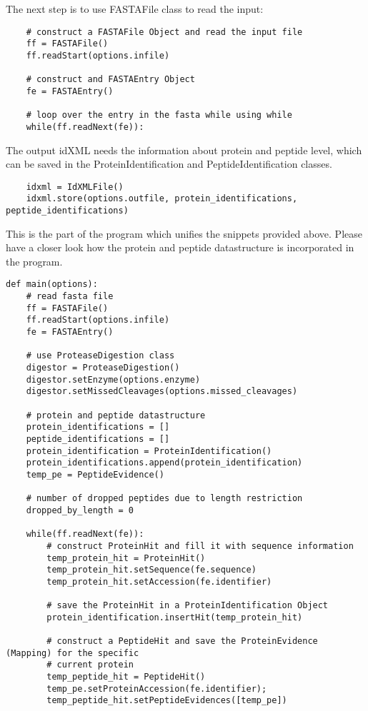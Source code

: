 {\noindent The next step is to use FASTAFile class to read the input:
\begin{lstlisting}
    # construct a FASTAFile Object and read the input file
    ff = FASTAFile()
    ff.readStart(options.infile)
    
    # construct and FASTAEntry Object 
    fe = FASTAEntry()
    
    # loop over the entry in the fasta while using while
    while(ff.readNext(fe)): 
\end{lstlisting}


\noindent The output idXML needs the information about protein and peptide level, which can be saved in the ProteinIdentification and PeptideIdentification classes. 
\begin{lstlisting}
    idxml = IdXMLFile()
    idxml.store(options.outfile, protein_identifications, peptide_identifications)
\end{lstlisting}

\noindent This is the part of the program which unifies the snippets provided above. Please have a closer look how the protein and peptide datastructure is incorporated in the program. 

\begin{lstlisting}
def main(options):
    # read fasta file  
    ff = FASTAFile()
    ff.readStart(options.infile)
    fe = FASTAEntry()

    # use ProteaseDigestion class 
    digestor = ProteaseDigestion()
    digestor.setEnzyme(options.enzyme)
    digestor.setMissedCleavages(options.missed_cleavages)

    # protein and peptide datastructure
    protein_identifications = []
    peptide_identifications = []
    protein_identification = ProteinIdentification()
    protein_identifications.append(protein_identification)
    temp_pe = PeptideEvidence()

    # number of dropped peptides due to length restriction
    dropped_by_length = 0

    while(ff.readNext(fe)):  
        # construct ProteinHit and fill it with sequence information
        temp_protein_hit = ProteinHit()
        temp_protein_hit.setSequence(fe.sequence)
        temp_protein_hit.setAccession(fe.identifier)

        # save the ProteinHit in a ProteinIdentification Object 
        protein_identification.insertHit(temp_protein_hit)
       
        # construct a PeptideHit and save the ProteinEvidence (Mapping) for the specific 
        # current protein
        temp_peptide_hit = PeptideHit()
        temp_pe.setProteinAccession(fe.identifier);
        temp_peptide_hit.setPeptideEvidences([temp_pe])


\end{lstlisting}}
